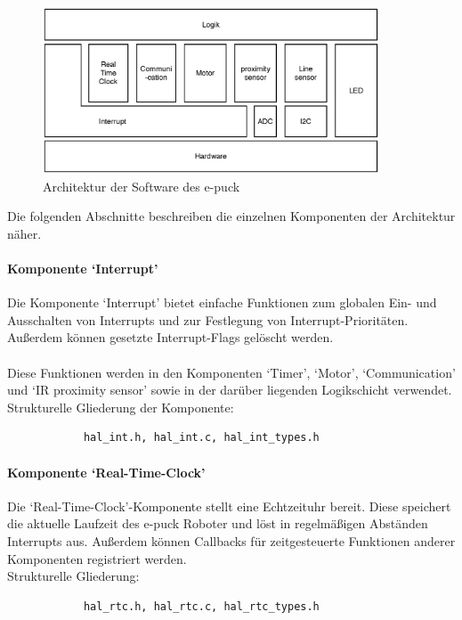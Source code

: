 \documentclass[10pt,a4paper]{article}
\begin{document}
		\begin{figure}[h]
			\centering
			\includegraphics[width=10cm]{images/e-puck_architecture.eps}
  			\caption{Architektur der Software des e-puck}
  		\end{figure}
		
		Die folgenden Abschnitte beschreiben die einzelnen Komponenten der Architektur näher.
		 
			\paragraph*{Komponente `Interrupt'}
			Die Komponente `Interrupt' bietet einfache Funktionen zum globalen Ein- und Ausschalten von Interrupts und zur Festlegung
			von Interrupt-Prioritäten. Außerdem können gesetzte Interrupt-Flags gelöscht werden. \\ \\
			Diese Funktionen werden in den Komponenten `Timer', `Motor', `Communication' und `IR proximity sensor' sowie
			in der darüber liegenden Logikschicht verwendet. \\
			
			Strukturelle Gliederung der Komponente:
			\begin{verbatim}  
			hal_int.h, hal_int.c, hal_int_types.h
			\end{verbatim}

			\paragraph*{Komponente `Real-Time-Clock'}
			Die `Real-Time-Clock'-Komponente stellt eine Echtzeituhr bereit. Diese speichert die aktuelle Laufzeit des e-puck Roboter und löst in
			regelmäßigen Abständen Interrupts aus.
			Außerdem können Callbacks für zeitgesteuerte Funktionen anderer Komponenten registriert werden. \\
			
			Strukturelle Gliederung:
			\begin{verbatim}  
			hal_rtc.h, hal_rtc.c, hal_rtc_types.h
			\end{verbatim}
			
\end{document}
